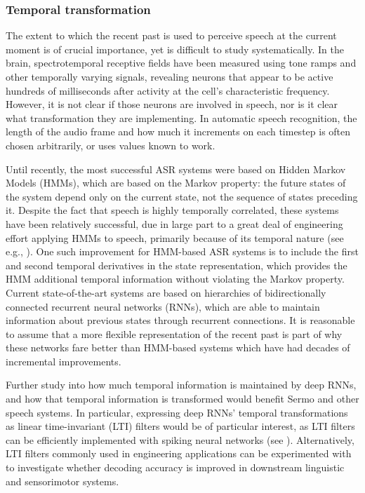 \subsubsection{Temporal transformation}

The extent to which the recent past
is used to perceive speech
at the current moment
is of crucial importance,
yet is difficult to study systematically.
In the brain, spectrotemporal receptive fields
have been measured using
tone ramps and other temporally varying signals,
revealing neurons that appear to be active
hundreds of milliseconds
after activity at
the cell's characteristic frequency.
However, it is not clear if those
neurons are involved in speech,
nor is it clear what transformation they are implementing.
In automatic speech recognition,
the length of the audio frame
and how much it increments on each timestep
is often chosen arbitrarily,
or uses values known to work.

Until recently,
the most successful ASR systems
were based on Hidden Markov Models (HMMs),
which are based on the Markov property:
the future states of the system depend
only on the current state,
not the sequence of states preceding it.
Despite the fact that speech
is highly temporally correlated,
these systems have been relatively successful,
due in large part to
a great deal of engineering effort
applying HMMs to speech,
primarily because of its temporal nature
(see e.g., \citealt{bahl1983,rabiner1989,lee1989}).
One such improvement for HMM-based ASR systems
is to include the first and second temporal derivatives
in the state representation,
which provides the HMM additional temporal information
without violating the Markov property.
Current state-of-the-art systems
are based on hierarchies of bidirectionally connected
recurrent neural networks (RNNs),
which are able to maintain information about
previous states through recurrent connections.
It is reasonable to assume that
a more flexible representation
of the recent past
is part of why these networks
fare better than HMM-based systems
which have had decades of incremental improvements.

Further study into how much temporal information
is maintained by deep RNNs,
and how that temporal information is transformed
would benefit Sermo
and other speech systems.
In particular, expressing deep RNNs'
temporal transformations as
linear time-invariant (LTI) filters
would be of particular interest,
as LTI filters can be efficiently implemented
with spiking neural networks
(see \citealt{eliasmith2004}).
Alternatively, LTI filters
commonly used in engineering applications
can be experimented with
to investigate whether decoding accuracy
is improved in downstream
linguistic and sensorimotor systems.

